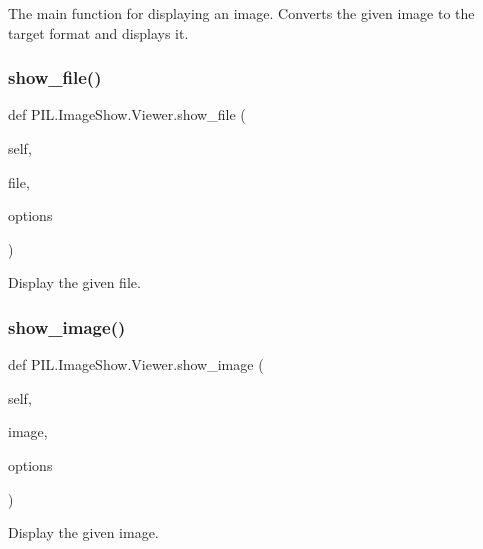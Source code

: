 \begin{DoxyVerb}The main function for displaying an image.
Converts the given image to the target format and displays it.
\end{DoxyVerb}
 \mbox{\label{classPIL_1_1ImageShow_1_1Viewer_ab19f8dc5c77a5172b5a416887e3e8bcc}} 
\subsubsection{\texorpdfstring{show\+\_\+file()}{show\_file()}}
{\footnotesize\ttfamily def P\+I\+L.\+Image\+Show.\+Viewer.\+show\+\_\+file (\begin{DoxyParamCaption}\item[{}]{self,  }\item[{}]{file,  }\item[{}]{options }\end{DoxyParamCaption})}

\begin{DoxyVerb}Display the given file.\end{DoxyVerb}
 \mbox{\label{classPIL_1_1ImageShow_1_1Viewer_aaec00878ea8a80a72f55cb317d9c8b4c}} 
\subsubsection{\texorpdfstring{show\+\_\+image()}{show\_image()}}
{\footnotesize\ttfamily def P\+I\+L.\+Image\+Show.\+Viewer.\+show\+\_\+image (\begin{DoxyParamCaption}\item[{}]{self,  }\item[{}]{image,  }\item[{}]{options }\end{DoxyParamCaption})}

\begin{DoxyVerb}Display the given image.\end{DoxyVerb}
 

